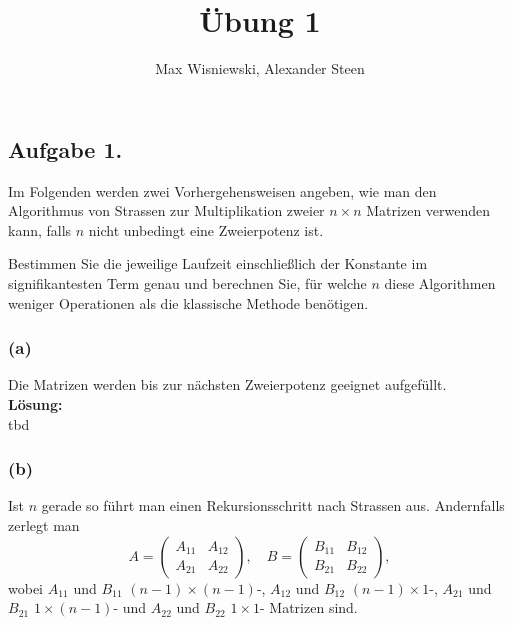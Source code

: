 \documentclass[11pt,a4paper,ngerman]{article}
\date{}
\title{Übung 1}
\author{Max Wisniewski, Alexander Steen}
\begin{document}

\renewcommand{\figurename}{Figure}

\maketitle
\thispagestyle{fancy}

\subsection*{Aufgabe 1.}

Im Folgenden werden zwei Vorhergehensweisen angeben, wie man den Algorithmus
von Strassen zur Multiplikation zweier $n \times n$ Matrizen verwenden kann, falls
$n$ nicht unbedingt eine Zweierpotenz ist.

Bestimmen Sie die jeweilige Laufzeit einschließlich der Konstante im signifikantesten
Term genau und berechnen Sie, für welche $n$ diese Algorithmen weniger Operationen als
die klassische Methode benötigen.

\subsubsection*{(a)}

Die Matrizen werden bis zur nächsten Zweierpotenz geeignet aufgefüllt.\\

\textbf{Lösung:}\\

tbd

\subsubsection*{(b)}

Ist $n$ gerade so führt man einen Rekursionsschritt nach Strassen aus.
Andernfalls zerlegt man
$$
A = \left( \begin{array}{cc} A_{11} & A_{12}\\A_{21} & A_{22}\end{array} \right),
\quad
B = \left( \begin{array}{cc} B_{11} & B_{12}\\B_{21} & B_{22}\end{array} \right),
$$
wobei $A_{11}$ und $B_{11}$ $(n-1) \times (n-1)$-, $A_{12}$ und $B_{12}$ $(n-1)\times 1$-, $A_{21}$ und $B_{21}$ $1\times (n-1)$- und $A_{22}$ und $B_{22}$ $1 \times 1$- Matrizen sind.
\end{document}
